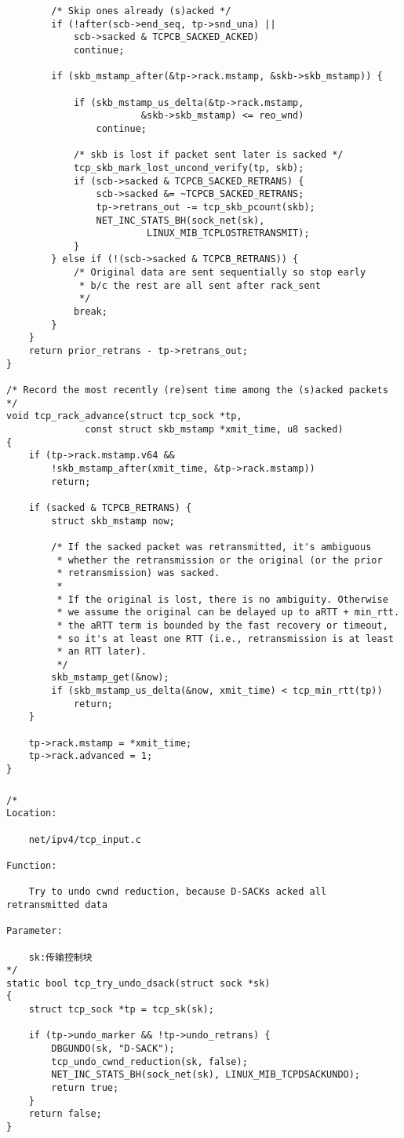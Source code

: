\begin{verbatim}
		/* Skip ones already (s)acked */
		if (!after(scb->end_seq, tp->snd_una) ||
		    scb->sacked & TCPCB_SACKED_ACKED)
			continue;

		if (skb_mstamp_after(&tp->rack.mstamp, &skb->skb_mstamp)) {

			if (skb_mstamp_us_delta(&tp->rack.mstamp,
						&skb->skb_mstamp) <= reo_wnd)
				continue;

			/* skb is lost if packet sent later is sacked */
			tcp_skb_mark_lost_uncond_verify(tp, skb);
			if (scb->sacked & TCPCB_SACKED_RETRANS) {
				scb->sacked &= ~TCPCB_SACKED_RETRANS;
				tp->retrans_out -= tcp_skb_pcount(skb);
				NET_INC_STATS_BH(sock_net(sk),
						 LINUX_MIB_TCPLOSTRETRANSMIT);
			}
		} else if (!(scb->sacked & TCPCB_RETRANS)) {
			/* Original data are sent sequentially so stop early
			 * b/c the rest are all sent after rack_sent
			 */
			break;
		}
	}
	return prior_retrans - tp->retrans_out;
}

/* Record the most recently (re)sent time among the (s)acked packets */
void tcp_rack_advance(struct tcp_sock *tp,
		      const struct skb_mstamp *xmit_time, u8 sacked)
{
	if (tp->rack.mstamp.v64 &&
	    !skb_mstamp_after(xmit_time, &tp->rack.mstamp))
		return;

	if (sacked & TCPCB_RETRANS) {
		struct skb_mstamp now;

		/* If the sacked packet was retransmitted, it's ambiguous
		 * whether the retransmission or the original (or the prior
		 * retransmission) was sacked.
		 *
		 * If the original is lost, there is no ambiguity. Otherwise
		 * we assume the original can be delayed up to aRTT + min_rtt.
		 * the aRTT term is bounded by the fast recovery or timeout,
		 * so it's at least one RTT (i.e., retransmission is at least
		 * an RTT later).
		 */
		skb_mstamp_get(&now);
		if (skb_mstamp_us_delta(&now, xmit_time) < tcp_min_rtt(tp))
			return;
	}

	tp->rack.mstamp = *xmit_time;
	tp->rack.advanced = 1;
}
\end{verbatim}
		\subsubsection{\texttt{}}
\begin{verbatim}
/*
Location:

	net/ipv4/tcp_input.c

Function:

	Try to undo cwnd reduction, because D-SACKs acked all retransmitted data

Parameter:

	sk:传输控制块
*/
static bool tcp_try_undo_dsack(struct sock *sk)
{
	struct tcp_sock *tp = tcp_sk(sk);

	if (tp->undo_marker && !tp->undo_retrans) {
		DBGUNDO(sk, "D-SACK");
		tcp_undo_cwnd_reduction(sk, false);
		NET_INC_STATS_BH(sock_net(sk), LINUX_MIB_TCPDSACKUNDO);
		return true;
	}
	return false;
}
\end{verbatim}
